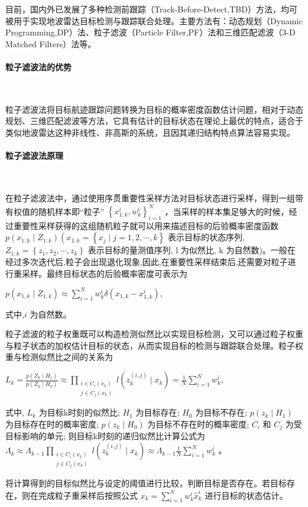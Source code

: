         目前，国内外已发展了多种检测前跟踪（Track-Before-Detect,TBD）方法，均可被用于实现地波雷达目标检测与跟踪联合处理。主要方法有：动态规划（Dynamic Programming,DP）法、粒子滤波（Particle Filter,PF）法和三维匹配滤波（3-D Matched Filters）法等。
        
\paragraph{ 粒子滤波法的优势}~{}

        粒子滤波法将目标航迹跟踪问题转换为目标的概率密度函数估计问题，相对于动态规划、三维匹配滤波等方法，它具有估计的目标状态在理论上最优的特点，适合于类似地波雷达这种非线性、非高斯的系统，且因其递归结构特点算法容易实现。
        
\paragraph{粒子滤波法原理}~{}

        在粒子滤波法中，通过使用序贯重要性采样方法对目标状态进行采样，得到一组带有权值的随机样本即“粒子” $\left\{x_{1: k}^{i}, w_{k}^{i}\right\}_{i=1}^{N}$ ，当采样的样本集足够大的时候，经过重要性采样获得的这组随机粒子就可以用来描述目标的后验概率密度函数   $p\left(x_{1: k} \mid Z_{1: k}\right)\left(x_{1: k}=\left\{x_{j} \mid j=1,2, \cdots, k\right\}\right.  $ 表示目标的状态序列,  $Z_{1: k}=\left\{z_{1}, z_{2}, \cdots\right. ,  \left.z_{k}\right\}  $ 表示目标的量测值序列, l 为似然比, k 为自然数)。一般在经过多次迭代后,粒子会出现退化现象,因此,在重要性采样结束后,还需要对粒子进行重采样。最终目标状态的后验概率密度可表示为 
      \begin{center}
           $p\left(x_{1, k} \mid Z_{1, k}\right) \approx \sum_{i=1}^{N} w_{k}^{i} \delta\left(x_{1, k}-x_{1, k}^{i}\right),$
      \end{center}
  \begin{flushleft}
    式中,$i$ 为自然数。
\end{flushleft}

        粒子滤波的粒子权重既可以构造检测似然比以实现目标检测，又可以通过粒子权重与粒子状态的加权估计目标的状态，从而实现目标的检测与跟踪联合处理。粒子权重与检测似然比之间的关系为
     \begin{center}
           $L_{k}=\frac{p\left(Z_{k} \mid H_{1}\right)}{p\left(Z_{k} \mid H_{0}\right)} \approx \prod_{\substack{i \in C_{i}\left(x_{k}\right) \\ j \in C_{j}\left(x_{k}\right)}} l\left(z_{k}^{(i, j)} \mid x_{k}\right)=\frac{1}{N} \sum_{i=1}^{N} w_{k}^{i},$
     \end{center}
 \begin{flushleft}
      式中,  $L_{k}$  为目标k时刻的似然比;  $H_{1}$  为目标存在;  $H_{0}$  为目标不存在;  $p\left(z_{k} \mid H_{1}\right)$  为目标存在时的概率密度;  $p\left(z_{k} \mid H_{0}\right)$  为目标不存在时的概率密度;  $C_{i}$  和  $C_{j}$  为受目标影响的单元; 则目标k时刻的递归似然比计算公式为  $\Lambda_{k} \approx \Lambda_{k-1} \prod_{\substack{i \in C_{i}\left(x_{k}\right) \\ j \in C_{j}\left(x_{k}\right)}} l\left(z_{k}^{(i, j)} \mid x_{k}\right) \approx \Lambda_{k-1} \frac{1}{N} \sum_{i=1}^{N} w_{k}^{i}$  。
 \end{flushleft}
 
        将计算得到的目标似然比与设定的阈值进行比较，判断目标是否存在。若目标存在，则在完成粒子重采样后按照公式 $x_{k}=\sum_{i=1}^{N} w_{k}^{i} \hat{x}_{k}^{i}$ 进行目标的状态估计。